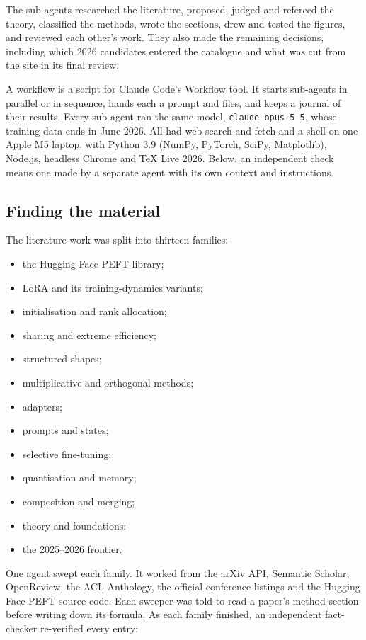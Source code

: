 The sub-agents researched the literature, proposed, judged and refereed the theory, classified the methods, wrote the sections, drew and tested the figures, and reviewed each other's work. They also made the remaining decisions, including which 2026 candidates entered the catalogue and what was cut from the site in its final review.

A workflow is a script for Claude Code's Workflow tool. It starts sub-agents in parallel or in sequence, hands each a prompt and files, and keeps a journal of their results. Every sub-agent ran the same model, \texttt{claude-opus-5-5}, whose training data ends in June 2026. All had web search and fetch and a shell on one Apple M5 laptop, with Python 3.9 (NumPy, PyTorch, SciPy, Matplotlib), Node.js, headless Chrome and TeX Live 2026. Below, an independent check means one made by a separate agent with its own context and instructions.

\subsection{Finding the material}

The literature work was split into thirteen families:

\begin{itemize}
\item the Hugging Face PEFT library;
\item LoRA and its training-dynamics variants;
\item initialisation and rank allocation;
\item sharing and extreme efficiency;
\item structured shapes;
\item multiplicative and orthogonal methods;
\item adapters;
\item prompts and states;
\item selective fine-tuning;
\item quantisation and memory;
\item composition and merging;
\item theory and foundations;
\item the 2025--2026 frontier.
\end{itemize}

One agent swept each family. It worked from the arXiv API, Semantic Scholar, OpenReview, the ACL Anthology, the official conference listings and the Hugging Face PEFT source code. Each sweeper was told to read a paper's method section before writing down its formula. As each family finished, an independent fact-checker re-verified every entry:

